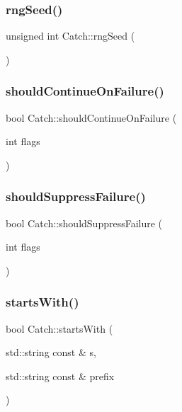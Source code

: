 \mbox{\label{namespace_catch_acf5ea05e942d2d7fe79111e12754ed76}} 
\subsubsection{rngSeed()}
{\footnotesize\ttfamily unsigned int Catch\+::rng\+Seed (\begin{DoxyParamCaption}{ }\end{DoxyParamCaption})}

\mbox{\label{namespace_catch_a7f7480b15d74965459c844f0d393ed87}} 
\subsubsection{shouldContinueOnFailure()}
{\footnotesize\ttfamily bool Catch\+::should\+Continue\+On\+Failure (\begin{DoxyParamCaption}\item[{int}]{flags }\end{DoxyParamCaption})}

\mbox{\label{namespace_catch_ab91eb13081203d634fe48d3d2ab386d7}} 
\subsubsection{shouldSuppressFailure()}
{\footnotesize\ttfamily bool Catch\+::should\+Suppress\+Failure (\begin{DoxyParamCaption}\item[{int}]{flags }\end{DoxyParamCaption})}

\mbox{\label{namespace_catch_a695f62327be0676e046291eeaae15110}} 
\subsubsection{startsWith()\hspace{0.1cm}{\footnotesize\ttfamily [1/2]}}
{\footnotesize\ttfamily bool Catch\+::starts\+With (\begin{DoxyParamCaption}\item[{std\+::string const \&}]{s,  }\item[{std\+::string const \&}]{prefix }\end{DoxyParamCaption})}

